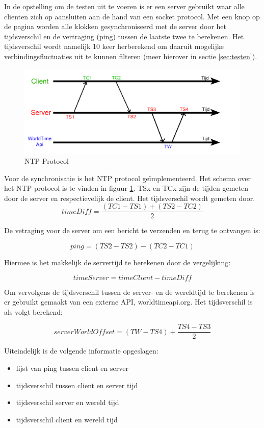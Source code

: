 In de opstelling om de testen uit te voeren is er een server gebruikt waar alle clienten zich op aansluiten aan de hand van een socket protocol. Met een knop op de pagina worden alle klokken gesynchroniseerd met de server door het tijdsverschil en de vertraging (ping) tussen de laatste twee te berekenen.
Het tijdsverschil wordt namelijk 10 keer herberekend om daaruit mogelijke verbindingsfluctuaties uit te kunnen filteren (meer hierover in sectie \ref{sec:testen}).

\begin{figure}[h]
\centering
\includegraphics[scale=0.4]{img/server-client-sync.jpg}
\caption{NTP Protocol} \label{serv-client}
\end{figure}

Voor de synchronisatie is het NTP protocol geïmplementeerd. 
Het schema over het NTP protocol is te vinden in figuur \ref{serv-client}. TSx en TCx zijn de tijden gemeten door de server en respectievelijk de client.
Het tijdsverschil wordt gemeten door.
\newline
\[ timeDiff = \frac{(TC1 - TS1) + (TS2 - TC2)}{2}  \]

De vetraging voor de server om een bericht te verzenden en terug te ontvangen is:

\[ ping  = (TS2 - TS2) - (TC2 - TC1) \]


Hiermee is het makkelijk de servertijd te berekenen door de vergelijking:

\[ timeServer = timeClient - timeDiff \]

Om vervolgens de tijdsverschil tussen de server- en de wereldtijd te berekenen is er gebruikt gemaakt van een externe API, worldtimeapi.org. Het tijdsverschil is als volgt berekend:

\[ serverWorldOffset = (TW - TS4) + \frac{TS4 - TS3}{2} \]

Uiteindelijk is de volgende informatie opgeslagen:

\begin{itemize}
  \item lijst van ping tussen client en server
  \item tijdsverschil tussen client en server tijd
  \item tijdsverschil server en wereld tijd
  \item tijdsverschil client en wereld tijd
\end{itemize}




